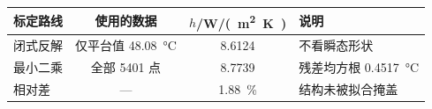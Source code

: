 \begin{tabular}{lccl}
  \toprule
    标定路线 & 使用的数据 & $h$/\si{W/(m^2.K)} & 说明 \\
  \midrule
    闭式反解 & 仅平台值 \SI{48.08}{\celsius} & 8.6124 & 不看瞬态形状 \\
    最小二乘 & 全部 5401 点 & 8.7739 & 残差均方根 \SI{0.4517}{\celsius} \\
  \midrule
    相对差 & --- & \SI{1.88}{\percent} & 结构未被拟合掩盖 \\
  \bottomrule
\end{tabular}
